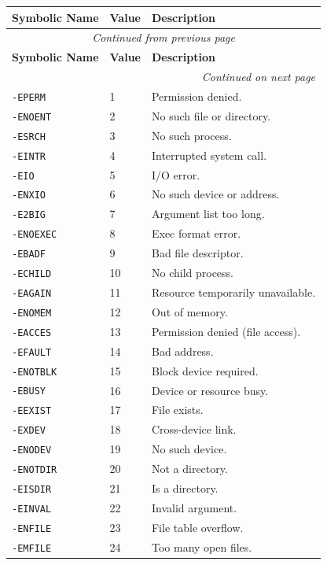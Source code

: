 \documentclass[12pt,a4paper]{article}
\begin{document}
\begin{longtable}{|l|l|p{}|}
\hline
\textbf{Symbolic Name} & \textbf{Value} & \textbf{Description} \\
\hline
\endfirsthead
\hline
\multicolumn{3}{|c|}{\textit{Continued from previous page}} \\
\hline
\textbf{Symbolic Name} & \textbf{Value} & \textbf{Description} \\
\hline
\endhead
\hline
\multicolumn{3}{|r|}{\textit{Continued on next page}} \\
\endfoot
\endlastfoot

\hline
\verb|-EPERM| & 1 & Permission denied. \\
\verb|-ENOENT| & 2 & No such file or directory. \\
\verb|-ESRCH| & 3 & No such process. \\
\verb|-EINTR| & 4 & Interrupted system call. \\
\verb|-EIO| & 5 & I/O error. \\
\verb|-ENXIO| & 6 & No such device or address. \\
\verb|-E2BIG| & 7 & Argument list too long. \\
\verb|-ENOEXEC| & 8 & Exec format error. \\
\verb|-EBADF| & 9 & Bad file descriptor. \\
\verb|-ECHILD| & 10 & No child process. \\
\verb|-EAGAIN| & 11 & Resource temporarily unavailable. \\
\verb|-ENOMEM| & 12 & Out of memory. \\
\verb|-EACCES| & 13 & Permission denied (file access). \\
\verb|-EFAULT| & 14 & Bad address. \\
\verb|-ENOTBLK| & 15 & Block device required. \\
\verb|-EBUSY| & 16 & Device or resource busy. \\
\verb|-EEXIST| & 17 & File exists. \\
\verb|-EXDEV| & 18 & Cross-device link. \\
\verb|-ENODEV| & 19 & No such device. \\
\verb|-ENOTDIR| & 20 & Not a directory. \\
\verb|-EISDIR| & 21 & Is a directory. \\
\verb|-EINVAL| & 22 & Invalid argument. \\
\verb|-ENFILE| & 23 & File table overflow. \\
\verb|-EMFILE| & 24 & Too many open files. \\

\end{longtable}
\end{document}
